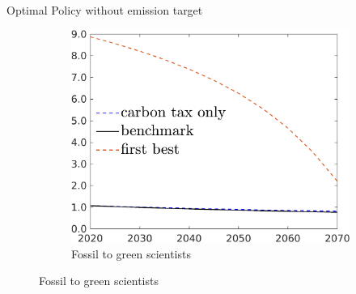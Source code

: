 \documentclass[11pt,aspectratio=169]{beamer}
\begin{document}
\begin{frame}{Optimal Policy without emission target}
\begin{figure}[h!!]
\begin{subfigure}{0.3\textwidth}
		\end{subfigure}
		\begin{subfigure}{0.3\textwidth}		
			\caption{{Fossil to green scientists}}
			\includegraphics[width=1\textwidth]{../codding_model/own_basedOnFried/optimalPol_010922_revision/figures/all_13Sept22/NewCalib_eff2pol_NoT_sffsg_Sun2_emnet1_spillover0_knspil3_xgr0_nsk0_sep0_extern0_PV1_etaa0.79_lgd1.png}
		\end{subfigure}
	\end{figure}
\end{frame}
\end{document}
